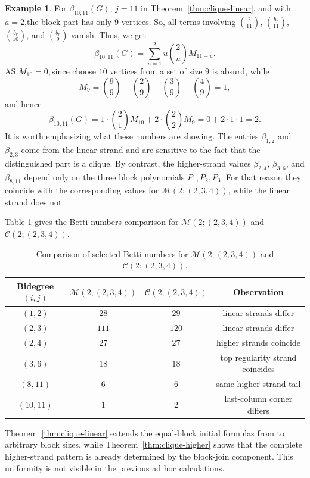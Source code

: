 \documentclass[12pt]{article}
\theoremstyle{definition}
\newtheorem{example}[theorem]{Example}
\theoremstyle{remark}
\newcommand{\MM}{\mathcal{M}}
\newcommand{\CC}{\mathcal{C}}
\begin{document}
\begin{example}
		\medskip
		\noindent
		For $\beta_{10,11}(G)$,  $j=11$ in Theorem~\ref{thm:clique-linear}, and with $a=2$,the block part has only $9$ vertices. So, all terms involving $\binom{2}{11}$, $\binom{b_r}{11}$, $\binom{b_r}{10}$, and $\binom{b_r}{9}$ vanish. Thus, we get 
		$$
		\beta_{10,11}(G)
		= \sum_{u=1}^{2} u\binom{2}{u}M_{11-u}.
		$$
		AS
		$ M_{10}=0 ,$since  choose $10$ vertices from a set of size $9$ is absurd, while
		$$
		M_9=\binom{9}{9}-\binom{2}{9}-\binom{3}{9}-\binom{4}{9}=1,
		$$
		and hence
		$$
		\beta_{10,11}(G)
		= 1\cdot \binom{2}{1}M_{10}
		+
		2\cdot \binom{2}{2}M_9
		= 0+2\cdot 1\cdot 1=2.
		$$
		 It is worth emphasizing what these numbers are showing. The entries $\beta_{1,2}$ and $\beta_{2,3}$ come from the linear strand and are sensitive to the fact that the distinguished part is a clique. By contrast, the higher-strand values $\beta_{2,4}$, $\beta_{3,6}$, and $\beta_{8,11}$ depend only on the three block polynomials $P_1,P_2,P_3$. For that reason they coincide with the corresponding values for $\MM(2;(2,3,4))$, while the linear strand does not.
	\end{example}
	
	
	Table \ref{tab:split-clique-compare} gives the Betti numbers comparison for $\MM(2;(2,3,4))$ and $\CC(2;(2,3,4))$.
	\begin{table}[H]
		\centering
		\caption{Comparison of selected Betti numbers for $\MM(2;(2,3,4))$ and $\CC(2;(2,3,4))$.}
		\label{tab:split-clique-compare}
		\begin{tabular}{@{}cccc@{}}
			\toprule
			Bidegree $(i,j)$ & $\MM(2;(2,3,4))$ & $\CC(2;(2,3,4))$ & Observation \\ \midrule
			$(1,2)$ & $28$ & $29$ & linear strands differ \\
			$(2,3)$ & $111$ & $120$ & linear strands differ \\
			$(2,4)$ & $27$ & $27$ & higher strands coincide \\
			$(3,6)$ & $18$ & $18$ & top regularity strand coincides \\
			$(8,11)$ & $6$ & $6$ & same higher-strand tail \\
			$(10,11)$ & $1$ & $2$ & last-column corner differs \\ \bottomrule
		\end{tabular}
	\end{table}
	
	 Theorem~\ref{thm:clique-linear} extends the equal-block initial formulas from \cite{Rather2024} to arbitrary block sizes, while Theorem~\ref{thm:clique-higher} shows that the complete higher-strand pattern is already determined by the block-join component. This uniformity is not visible in the previous ad hoc calculations.
	
\end{document}
